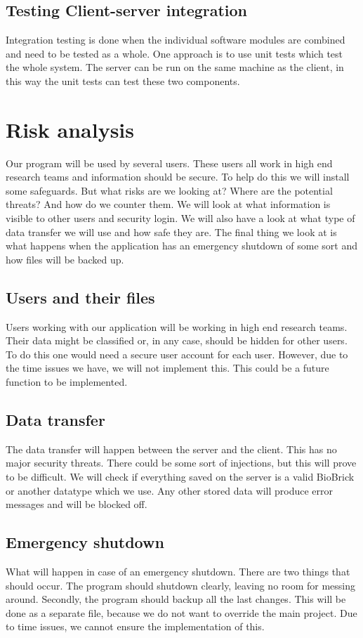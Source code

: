 \documentclass[a4paper]{article}
\begin{document}



\subsection{Testing Client-server integration}
Integration testing is done when the individual software modules are combined and need to be tested as a whole. One approach is to use unit tests which test the whole system. The server can be run on the same machine as the client, in this way the unit tests can test these two components.

\section{Risk analysis}
Our program will be used by several users. These users all work in high end research teams and information should be secure. To help do this we will install some safeguards. But what risks are we looking at? Where are the potential threats? And how do we counter them. We will look at what information is visible to other users and security login. We will also have a look at what type of data transfer we will use and how safe they are. The final thing we look at is what happens when the application has an emergency shutdown of some sort and how files will be backed up.

\subsection{Users and their files}
Users working with our application will be working in high end research teams. Their data might be classified or, in any case, should be hidden for other users. To do this one would need a secure user account for each user. However, due to the time issues we have, we will not implement this. This could be a future function to be implemented.

\subsection{Data transfer}
The data transfer will happen between the server and the client. This has no major security threats. There could be some sort of injections, but this will prove to be difficult. We will check if everything saved on the server is a valid BioBrick or another datatype which we use. Any other stored data will produce error messages and will be blocked off.

\subsection{Emergency shutdown}
What will happen in case of an emergency shutdown. There are two things that should occur. The program should shutdown clearly, leaving no room for messing around. Secondly, the program should backup all the last changes. This will be done as a separate file, because we do not want to override the main project. Due to time issues, we cannot ensure the implementation of this.
\end{document}
